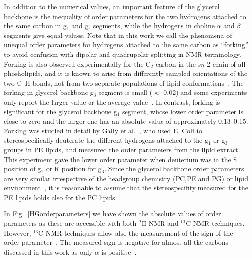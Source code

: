 \documentclass[pre,aps,floatfix,authordate1-4,twocolumn]{revtex4-1}
\begin{document}
In addition to the numerical values, an important feature of the glycerol backbone is the 
inequality of order parameters for the two hydrogens attached to the same carbon in g$_1$ and g$_3$ segments,
while the hydrogens in choline $\alpha$ and $\beta$ segments give equal values.
Note that in this work we call the phenomena of unequal order parameters for hydrogens attached to the same carbon as ``forking'' to avoid 
confusion with dipolar and quadrupolar splitting in NMR terminology. Forking is also observed experimentally for the C$_2$ carbon in the \textit{sn}-2
chain of all phosholipids, and it is known to arise from differently sampled orientations of the two C--H bonds, not from two 
separate populations of lipid conformations~\cite{engel81}. The forking in glycerol backbone g$_3$ segment is small ($\approx$ 0.02) 
and some experiments only report the larger value or the average value~\cite{akutsu81,ferreira13}. 
In contrast, forking is significant for the glycerol backbone g$_1$ segment, whose lower order parameter is close to zero and the
larger one has an absolute value of approximately 0.13--0.15. Forking was studied in detail by Gally et al.~\cite{gally81}, who used E. Coli to 
stereospecifically deuterate the different hydrogens attached to the g$_1$ or g$_3$ groups in PE lipids, and measured the order parameters from the lipid 
extract. This experiment gave the lower order parameter when deuterium was in the S position of g$_1$ or R position for g$_3$.
Since the glycerol backbone order parameters are very similar irrespective of the headgroup chemistry (PC,PE and PG) or lipid 
environment~\cite{gally81}, it is reasonable to assume that the stereospecifity measured for the PE lipids
holds also for the PC lipids.

In Fig.~\ref{HGorderparameters} we have shown the absolute values of order parameters as these are accessible
with both $^2$H NMR and $^{13}$C NMR techniques. However, $^{13}$C NMR techniques allow also the measurement of 
the sign of the order parameter~\cite{hong95a,hong95b,gross97}. The measured sign is negative for almost all the carbons 
discussed in this work as only $\alpha$ is positive~\cite{hong95a,hong95b,gross97}. 
\end{document}
